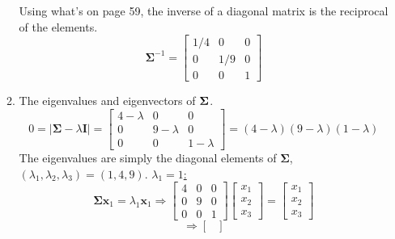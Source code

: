 \begin{enumerate}[font=\bfseries]
\begin{enumerate}
            Using what's on page 59, the inverse of a diagonal matrix is the reciprocal of the elements.
            \[
                \mathbf{\Sigma}^{-1}
                =
                \begin{bmatrix}
                    1/4 & 0 & 0 \\
                    0 & 1/9 & 0 \\
                    0 & 0 & 1
                \end{bmatrix}
            \]
            \item The eigenvalues and eigenvectors of $\bold{\Sigma}$.
            \[
                 0 = \left|\mathbf{\Sigma} - \lambda\mathbf{I}\right|
                 =
                 \begin{bmatrix}
                    4-\lambda & 0 & 0 \\
                    0 & 9-\lambda & 0 \\
                    0 & 0 & 1-\lambda
                 \end{bmatrix}
                 =
                 \left(4-\lambda\right)\left(9-\lambda\right)\left(1-\lambda\right)
            \]
            The eigenvalues are simply the diagonal elements of $\mathbf{\Sigma}$, $\left(\lambda_1, \lambda_2, \lambda_3\right) = \left(1,4,9\right)$.
            \newline
            \underline{$\lambda_1 = 1$:}
            \[
                \mathbf{\Sigma}\mathbf{x}_1 = \lambda_1\mathbf{x}_1
                \Rightarrow
                \begin{bmatrix}
                    4 & 0 & 0\\
                    0 & 9 & 0\\
                    0 & 0 & 1
                \end{bmatrix}
                \begin{bmatrix}
                    x_1 \\
                    x_2 \\
                    x_3
                \end{bmatrix}
                =
                \begin{bmatrix}
                    x_1 \\
                    x_2 \\
                    x_3
                \end{bmatrix}
            \]
            \[
                \Rightarrow
                \begin{bmatrix}

\end{bmatrix}\]
\end{enumerate}
\end{enumerate}
